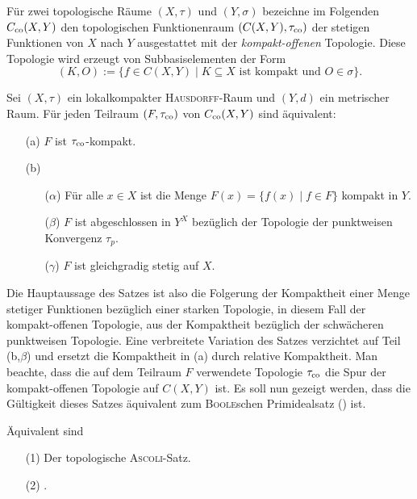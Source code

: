 Für zwei topologische Räume $(X,\tau)$ und $(Y,\sigma)$ bezeichne im Folgenden $C_{\mathrm{co}}(X,Y)$ den topologischen Funktionenraum $(C(X,Y),\tau_{\mathrm{co}})$ der stetigen Funktionen von $X$ nach $Y$ ausgestattet mit der \textit{kompakt\hyp{}offenen} Topologie.
Diese Topologie wird erzeugt von Subbasiselementen der Form
\begin{displaymath}
  (K,O) := \{f \in C(X,Y) \mid K \subseteq X \text{ ist kompakt und } O \in \sigma\}.
\end{displaymath}

\begin{defn}
  Sei $(X,\tau)$ ein lokalkompakter \textsc{Hausdorff}\hyp{}Raum und $(Y,d)$ ein metrischer Raum.
  Für jeden Teilraum $(F,\tau_{\mathrm{co}})$ von $C_{\mathrm{co}}(X,Y)$ sind äquivalent:
  \begin{enumerate}
    \item[(a)] $F$ ist $\tau_{\mathrm{co}}$\hyp{}kompakt.
    \item[(b)] \begin{enumerate}
        \item[($\alpha$)] Für alle $x \in X$ ist die Menge $F(x) = \{f(x) \mid f \in F \}$ kompakt in $Y$.
        \item[($\beta$)]  $F$ ist abgeschlossen in $Y^X$ bezüglich der Topologie der punktweisen Konvergenz $\tau_p$.
        \item[($\gamma$)] $F$ ist gleichgradig stetig auf $X$.
      \end{enumerate}
  \end{enumerate}
\end{defn}

Die Hauptaussage des Satzes ist also die Folgerung der Kompaktheit einer Menge stetiger Funktionen bezüglich einer starken Topologie, in diesem Fall der kompakt\hyp{}offenen Topologie, aus der Kompaktheit bezüglich der schwächeren punktweisen Topologie.
Eine verbreitete Variation des Satzes verzichtet auf Teil (b,$\beta$) und ersetzt die Kompaktheit in (a) durch relative Kompaktheit.
Man beachte, dass die auf dem Teilraum $F$ verwendete Topologie $\tau_{\mathrm{co}}$ die Spur der kompakt\hyp{}offenen Topologie auf $C(X,Y)$ ist.
Es soll nun gezeigt werden, dass die Gültigkeit dieses Satzes äquivalent zum \textsc{Boole}schen Primidealsatz (\PIT) ist.

\begin{thm}
  \label{thm:ascoliPIT}
  Äquivalent sind
  \begin{enumerate}
    \item[(1)] Der topologische \textsc{Ascoli}-Satz.
    \item[(2)] \PIT.
  \end{enumerate}
\end{thm}

